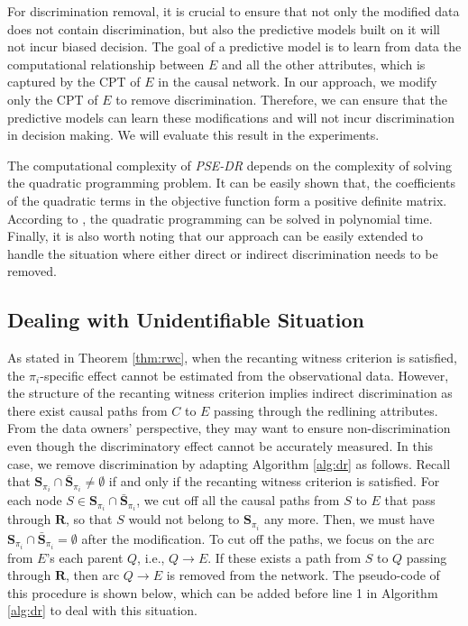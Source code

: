 \documentclass[letterpaper]{article}
\begin{document}
For discrimination removal, it is crucial to ensure that not only the modified data does not contain discrimination, but also the predictive models built on it will not incur biased decision. The goal of a predictive model is to learn from data the computational relationship between $E$ and all the other attributes, which is captured by the CPT of $E$ in the causal network. In our approach, we modify only the CPT of $E$ to remove discrimination. Therefore, we can ensure that the predictive models can learn these modifications and will not incur discrimination in decision making. We will evaluate this result in the experiments.


The computational complexity of \emph{PSE-DR} depends on the complexity of solving the quadratic programming problem. It can be easily shown that, the coefficients of the quadratic terms in the objective function form a positive definite matrix. According to \cite{kozlov1980polynomial}, the quadratic programming can be solved in polynomial time. Finally, it is also worth noting that our approach can be easily extended to handle the situation where either direct or indirect discrimination needs to be removed.

\subsection{Dealing with Unidentifiable Situation}\label{sec:uni}
As stated in Theorem \ref{thm:rwc}, when the recanting witness criterion is satisfied, the $\pi_{i}$-specific effect cannot be estimated from the observational data. However, the structure of the recanting witness criterion implies indirect discrimination as there exist causal paths from $C$ to $E$ passing through the redlining attributes. From the data owners' perspective, they may want to ensure non-discrimination even though the discriminatory effect cannot be accurately measured. In this case, we remove discrimination by adapting Algorithm \ref{alg:dr} as follows. Recall that $\mathbf{S}_{\pi_{i}}\cap \bar{\mathbf{S}}_{\pi_{i}} \neq \emptyset$ if and only if the recanting witness criterion is satisfied. For each node $S\in \mathbf{S}_{\pi_{i}}\cap \bar{\mathbf{S}}_{\pi_{i}}$, we cut off all the causal paths from $S$ to $E$ that pass through $\mathbf{R}$, so that $S$ would not belong to $\mathbf{S}_{\pi_{i}}$ any more. Then, we must have $\mathbf{S}_{\pi_{i}}\cap \bar{\mathbf{S}}_{\pi_{i}} = \emptyset$ after the modification. 
To cut off the paths, we focus on the arc from $E$'s each parent $Q$, i.e., $Q\rightarrow E$. If these exists a path from $S$ to $Q$ passing through $\mathbf{R}$, then arc $Q\rightarrow E$ is removed from the network. 
The pseudo-code of this procedure is shown below, which can be added before line 1 in Algorithm \ref{alg:dr} to deal with this situation.
\end{document}
